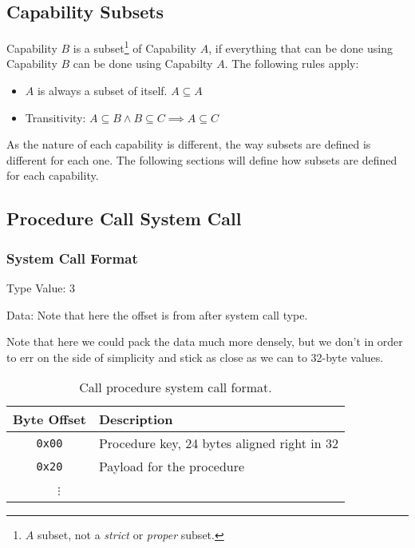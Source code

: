 \documentclass[english,a4paper]{article}
\let\oldparagraph\subsubsection
\renewcommand{\subsubsection}[1]{\oldparagraph{#1}\mbox{}}
\begin{document}
\subsection{Capability Subsets}\label{cap-subsets}

Capability $B$ is a subset\footnote{$A$ subset, not a \emph{strict} or
\emph{proper} subset.} of Capability $A$, if everything that can be done using
Capability $B$ can be done using Capabilty $A$. The following rules apply:

\begin{itemize}
  \item $A$ is always a subset of itself. $A \subseteq A$
  \item Transitivity: $A \subseteq B \land B \subseteq C \implies A
  \subseteq C$
\end{itemize}

As the nature of each capability is different, the way subsets are defined is
different for each one. The following sections will define how subsets are
defined for each capability.

\subsection{Procedure Call System Call}

\subsubsection{System Call Format}
Type Value: 3

Data: Note that here the offset is from after system call type.

Note that here we could pack the data much more densely, but we don't in order
to err on the side of simplicity and stick as close as we can to 32-byte values.

\begin{table}[H]
  \caption{Call procedure system call format.}
  \centering{}%
  \begin{tabularx}{\textwidth}{c|X}
    \hline
    Byte Offset & Description \\
    \hline
    \hline
    \texttt{0x00} & Procedure key, 24 bytes aligned right in 32 \\
    \texttt{0x20} & Payload for the procedure \\
    ~~~$\vdots$ &  \\
    \hline
  \end{tabularx}
\end{table}
\end{document}
